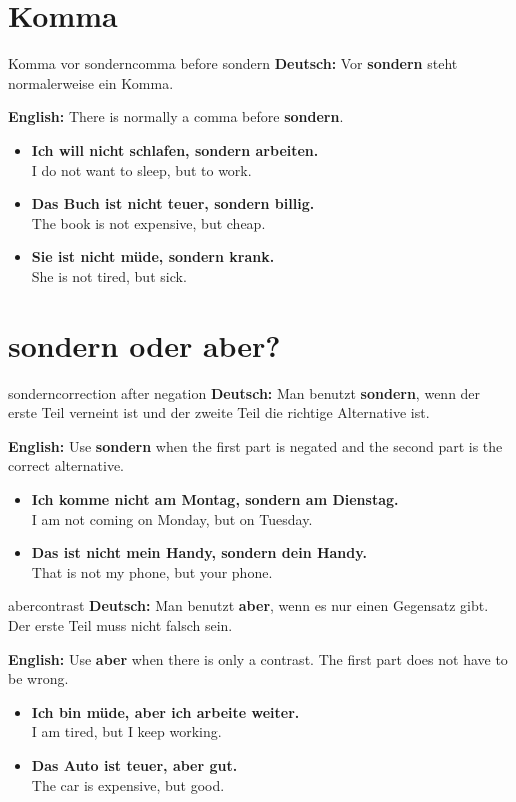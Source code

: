 \documentclass[a4paper,11pt]{article}
\newcommand{\GermanText}[1]{\textbf{Deutsch: }#1\par}
\newcommand{\EnglishText}[1]{{\small\color{SoftGray}\textbf{English: }#1\par}}
\newcommand{\ExampleItem}[2]{\item \textbf{#1}\\{\small\color{SoftGray}#2}}
\begin{document}
\section{Komma}

\begin{grammarentry}{Komma vor sondern}{comma before sondern}
\GermanText{Vor \textbf{sondern} steht normalerweise ein Komma.}
\EnglishText{There is normally a comma before \textbf{sondern}.}

\begin{exbox}
\begin{itemize}
    \ExampleItem{Ich will nicht schlafen, sondern arbeiten.}{I do not want to sleep, but to work.}
    \ExampleItem{Das Buch ist nicht teuer, sondern billig.}{The book is not expensive, but cheap.}
    \ExampleItem{Sie ist nicht müde, sondern krank.}{She is not tired, but sick.}
\end{itemize}
\end{exbox}
\end{grammarentry}

\section{sondern oder aber?}

\begin{grammarentry}{sondern}{correction after negation}
\GermanText{Man benutzt \textbf{sondern}, wenn der erste Teil verneint ist und der zweite Teil die richtige Alternative ist.}
\EnglishText{Use \textbf{sondern} when the first part is negated and the second part is the correct alternative.}

\begin{exbox}
\begin{itemize}
    \ExampleItem{Ich komme nicht am Montag, sondern am Dienstag.}{I am not coming on Monday, but on Tuesday.}
    \ExampleItem{Das ist nicht mein Handy, sondern dein Handy.}{That is not my phone, but your phone.}
\end{itemize}
\end{exbox}
\end{grammarentry}

\begin{grammarentry}{aber}{contrast}
\GermanText{Man benutzt \textbf{aber}, wenn es nur einen Gegensatz gibt. Der erste Teil muss nicht falsch sein.}
\EnglishText{Use \textbf{aber} when there is only a contrast. The first part does not have to be wrong.}

\begin{exbox}
\begin{itemize}
    \ExampleItem{Ich bin müde, aber ich arbeite weiter.}{I am tired, but I keep working.}
    \ExampleItem{Das Auto ist teuer, aber gut.}{The car is expensive, but good.}
\end{itemize}
\end{exbox}
\end{grammarentry}
\end{document}
